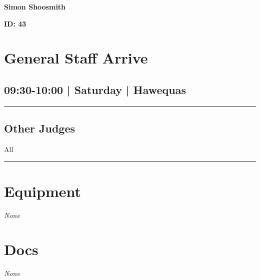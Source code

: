 \documentclass[10pt, A5]{article}
\newcommand{\newtitle}[1]{\begin{center}{\Huge\bfseries #1 }\\ \vspace{5mm}\end{center}}
\newcommand{\newsubtitle}[1]{\begin{center}{\color{grey}\Large\bfseries #1 }\\ \vspace{5mm}\end{center}}
\begin{document}
		\newtitle{Simon Shoosmith}
	\newsubtitle{ID: 43}


        \begin{framed}
        \begin{minipage}{\textwidth}

        \setcounter{section}{2}
        \section{General Staff Arrive}
        \subsection*{09:30-10:00 | Saturday | Hawequas}

        \vspace{0.25cm}
        \hrule
        \vspace{0.25cm}


        \subsection*{Other Judges}
                    All

            \vspace{0.25cm}
        \hrule
        \vspace{0.25cm}

        \begin{multicols}{2}

		\section*{\faWrench \: Equipment}

				\textit{None}
		
		\vfill\null
		\columnbreak

			\section*{\faFile \: Docs}
		 	\textit{None}
	

		\vfill\null

		\end{multicols}
\end{minipage}
\end{framed}
\end{document}
